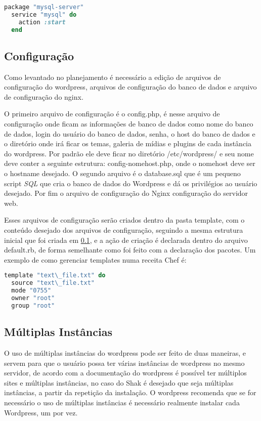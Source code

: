 \begin{lstlisting}[language=Ruby,label=dice_index,caption={Exemplo de criação de serviço do mysql com o chef}]
  package "mysql-server"
  service "mysql" do
    action :start
  end
\end{lstlisting}


\subsection{Configuração}
\label{wordpress:preparacao}

Como levantado no planejamento é necessário a edição de arquivos de configuração
do wordpress, arquivos de configuração do banco de dados e arquivo de configuração
do nginx.

O primeiro arquivo de configuração é o config.php, é nesse arquivo de
configuração onde ficam as informações de banco de dados como nome do banco de dados,
login do usuário do banco de dados, senha, o host do banco de dados e o diretório
onde irá ficar os temas, galeria de mídias e plugins de cada instância do wordpress.
Por padrão ele deve ficar no diretório /etc/wordpress/ e seu nome deve conter
a seguinte estrutura: config-nomehost.php, onde o nomehost deve ser o hostname
desejado. O segundo arquivo é o database.sql que é um pequeno script \textit{SQL} que
cria o banco de dados do Wordpress e dá os privilégios ao usuário desejado. Por fim
o arquivo de configuração do Nginx configuração do servidor web.

Esses arquivos de configuração serão criados dentro da pasta template, com o conteúdo
desejado dos arquivos de configuração, seguindo a mesma estrutura
inicial que foi criada em \ref{wordpress:preparacao}, e a ação de criação é
declarada dentro do arquivo default.rb, de forma semelhante como foi feito com
a declaração dos pacotes. Um exemplo de como gerenciar templates numa receita Chef
é:

\begin{lstlisting}[language=Ruby,label=dice_index,caption={Exemplo de criação de templates com o chef}]
  template "text\_file.txt" do
  source "text\_file.txt"
  mode "0755"
  owner "root"
  group "root"
\end{lstlisting}

\subsection{Múltiplas Instâncias}

O uso de múltiplas instâncias do wordpress pode ser feito de duas maneiras, e servem
para que o usuário possa ter várias instâncias de wordpress no mesmo servidor, de
acordo com a documentação do wordpress é possível ter múltiplos sites e múltiplas
instâncias, no caso do Shak é desejado que seja múltiplas instâncias, a partir da
repetição da instalação. O wordpress recomenda que se for necessário o uso de múltiplas
instâncias é necessário realmente instalar cada Wordpress, um por vez.

